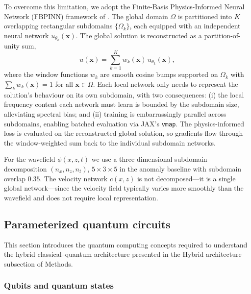 To overcome this limitation, we adopt the Finite-Basis Physics-Informed Neural Network (FBPINN) framework of \textcite{Moseley2023}. The global domain $\Omega$ is partitioned into $K$ overlapping rectangular subdomains $\{\Omega_k\}$, each equipped with an independent neural network $u_{\theta_k}(\mathbf{x})$. The global solution is reconstructed as a partition-of-unity sum,
\begin{equation}
    u(\mathbf{x}) = \sum_{k=1}^{K} w_k(\mathbf{x})\, u_{\theta_k}(\mathbf{x}),
\end{equation}
where the window functions $w_k$ are smooth cosine bumps supported on $\Omega_k$ with $\sum_k w_k(\mathbf{x}) = 1$ for all $\mathbf{x} \in \Omega$. Each local network only needs to represent the solution's behaviour on its own subdomain, with two consequences: (i) the local frequency content each network must learn is bounded by the subdomain size, alleviating spectral bias; and (ii) training is embarrassingly parallel across subdomains, enabling batched evaluation via JAX's \texttt{vmap}. The physics-informed loss is evaluated on the reconstructed global solution, so gradients flow through the window-weighted sum back to the individual subdomain networks.

For the wavefield $\phi(x,z,t)$ we use a three-dimensional subdomain decomposition $(n_x, n_z, n_t)$, $5\!\times\!3\!\times\!5$ in the anomaly baseline with subdomain overlap $0.35$. The velocity network $c(x,z)$ is not decomposed---it is a single global network---since the velocity field typically varies more smoothly than the wavefield and does not require local representation.


\subsection{Parameterized quantum circuits}
\label{sec:methods_pqc}

This section introduces the quantum computing concepts required to
understand the hybrid classical--quantum architecture presented in
the Hybrid architecture subsection of Methods.

\subsubsection{Qubits and quantum states}

